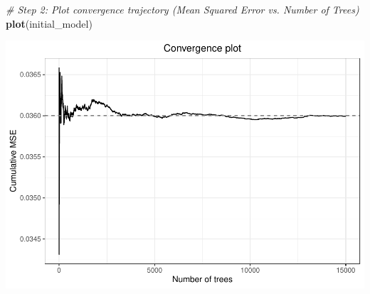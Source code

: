 \documentclass[
]{book}
\newenvironment{Shaded}{\begin{snugshade}}{\end{snugshade}}
\newcommand{\CommentTok}[1]{\textcolor[rgb]{0.56,0.35,0.01}{\textit{#1}}}
\newcommand{\FunctionTok}[1]{\textcolor[rgb]{0.13,0.29,0.53}{\textbf{#1}}}
\newcommand{\NormalTok}[1]{#1}
\begin{document}
\begin{Shaded}
\begin{Highlighting}[]
\CommentTok{\# Step 2: Plot convergence trajectory (Mean Squared Error vs. Number of Trees)}
\FunctionTok{plot}\NormalTok{(initial\_model)}
\end{Highlighting}
\end{Shaded}

\includegraphics{_main_files/figure-latex/unnamed-chunk-14-1.pdf}
\end{document}
